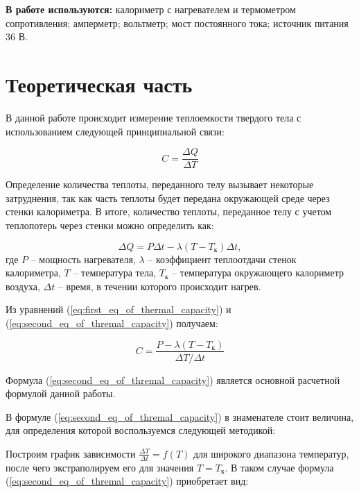\documentclass[a4paper,12pt]{article} %
\begin{document}
\textbf{В работе используются:} калориметр с нагревателем и термометром сопротивления; амперметр; вольтметр; мост постоянного тока; источник питания 36 В.

\section{Теоретическая часть}
В данной работе происходит измерение теплоемкости твердого тела с использованием следующей принципиальной связи:
	
\begin{equation}
	C = \frac{\Delta Q}{\Delta T}
	\label{eq:first_eq_of_thermal_capacity}
\end{equation}

Определение количества теплоты, переданного телу вызывает некоторые затруднения, так как часть теплоты будет передана окружающей среде через стенки калориметра. В итоге, количество теплоты, переданное телу с учетом теплопотерь через стенки можно определить как:

\begin{equation}
	\Delta Q = P\Delta t - \lambda \left( T - T_{\text{к}} \right) \Delta t,
	\label{eq:termal_with_heat_lossing}
\end{equation}
 где $P$ -- мощность нагревателя, $\lambda$ -- коэффициент теплоотдачи стенок калориметра, $T$ -- температура тела, $T_{\text{к}}$ -- температура окружающего калориметр воздуха, $\Delta t$ -- время, в течении которого происходит нагрев.
 
 Из уравнений (\ref{eq:first_eq_of_thermal_capacity}) и (\ref{eq:second_eq_of_thremal_capacity}) получаем:
 
 \begin{equation}
 	C = \frac{P - \lambda \left(T - T_{\text{к}} \right) }{\Delta T /\Delta t}
 	\label{eq:second_eq_of_thremal_capacity}
 \end{equation}
 
Формула (\ref{eq:second_eq_of_thremal_capacity}) является основной расчетной формулой данной работы.

В формуле (\ref{eq:second_eq_of_thremal_capacity}) в знаменателе стоит величина, для определения которой воспользуемся следующей методикой:

Построим график зависимости $\displaystyle \frac{\Delta T}{\Delta t} = f \left( T \right)$ для широкого диапазона температур, после чего экстраполируем его для значения $T = T_{\text{к}}$. В таком случае формула (\ref{eq:second_eq_of_thremal_capacity}) приобретает вид:
\end{document}
